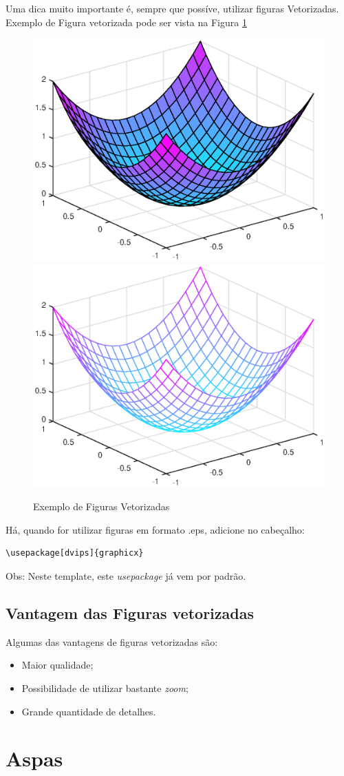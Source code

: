 \documentclass[journal]{IEEEtran}
\begin{document}
Uma dica muito importante é, sempre que possíve, utilizar figuras Vetorizadas. Exemplo de Figura vetorizada pode ser vista na Figura \ref{fig.vet}
\begin{figure}
	\centering
	\label{fig.vet}
	\includegraphics[width=.45\linewidth]{figs/g1}
	\includegraphics[width=.45\linewidth]{figs/g2}
	\caption{Exemplo de Figuras Vetorizadas}
\end{figure}

Há, quando for utilizar figuras em formato .eps, adicione no cabeçalho:
\begin{verbatim}
\usepackage[dvips]{graphicx}
\end{verbatim}

Obs: Neste template, este \textit{usepackage} já vem por padrão.

\subsection{Vantagem das Figuras vetorizadas}
Algumas das vantagens de figuras vetorizadas são:
\begin{itemize}
	\item Maior qualidade;
	\item Possibilidade de utilizar bastante \textit{zoom};
	\item Grande quantidade de detalhes.
\end{itemize}

\section{Aspas}
\end{document}
